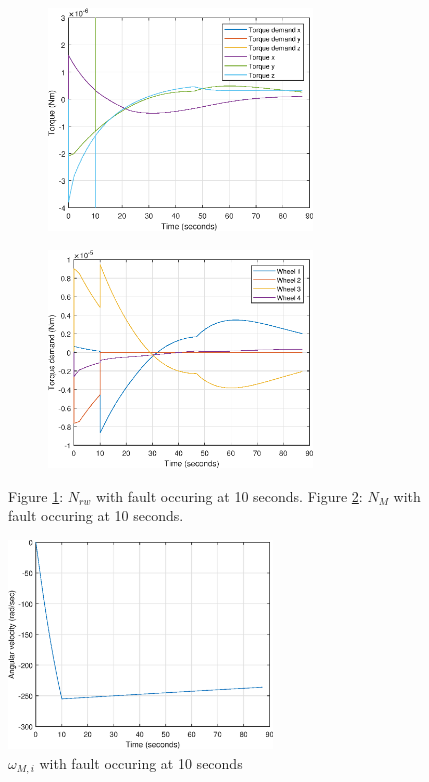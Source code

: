 \begin{figure}
	\centering
	\begin{subfigure}{.5\textwidth}
	\centering
\includegraphics[width=70mm]{figures/smooth3dtorque}
\caption{}
	\label{fig:resreconfig_nrw}
	\end{subfigure}%
	\begin{subfigure}{.5\textwidth}
	\centering
\includegraphics[width=70mm]{figures/smooth_motor_torque}
\caption{}
\label{fig:resreconfig_nm}
	\end{subfigure}
	\caption{Figure \ref{fig:resreconfig_nrw}: $N_{rw}$ with fault occuring at 10 seconds. Figure \ref{fig:resreconfig_nm}: $N_M$ with fault occuring at 10 seconds.}
	\label{fig:resreconfig}
\end{figure}

%

\begin{figure}
\centering
\includegraphics[width=70mm]{figures/smooth_omega_residual}
\caption{$\omega_{M,i}$ with fault occuring at 10 seconds}
\label{fig:resreconfig_ome}
\end{figure} 